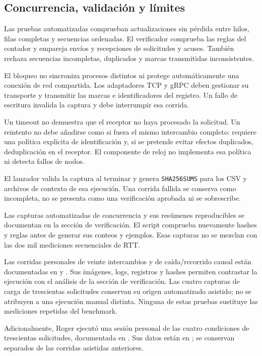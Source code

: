 \subsection{Concurrencia, validación y límites}
Las pruebas automatizadas comprueban actualizaciones sin pérdida entre hilos,
filas completas y secuencias ordenadas. El verificador
 comprueba las reglas del contador y empareja
envíos y recepciones de solicitudes y acuses. También rechaza secuencias
incompletas, duplicados y marcas transmitidas inconsistentes.

El bloqueo no sincroniza procesos distintos ni protege automáticamente una
conexión de red compartida. Los adaptadores TCP y gRPC deben gestionar su
transporte y transmitir las marcas e identificadores del registro. Un fallo
de escritura invalida la captura y debe interrumpir esa corrida.

Un timeout no demuestra que el receptor no haya procesado la solicitud. Un
reintento no debe añadirse como si fuera el mismo intercambio completo: requiere
una política explícita de identificación y, si se pretende evitar efectos
duplicados, deduplicación en el receptor. El componente de reloj no implementa
esa política ni detecta fallos de nodos.

El lanzador valida la captura al terminar y genera \texttt{SHA256SUMS} para los
CSV y archivos de contexto de esa ejecución. Una corrida fallida se conserva
como incompleta, no se presenta como una verificación aprobada ni se sobrescribe.

Las capturas automatizadas de concurrencia y sus resúmenes reproducibles se
documentan en la sección de verificación. El script
 comprueba nuevamente hashes y reglas
antes de generar sus conteos y ejemplos. Esas capturas no se mezclan con las
dos mil mediciones secuenciales de RTT.

Las corridas personales de veinte intercambios y de caída/recorrido causal están
documentadas en  y
. Sus imágenes, logs, registros y hashes
permiten contrastar la ejecución con el análisis de la sección de verificación.
Las cuatro capturas de carga de trescientas solicitudes conservan su origen
automatizado asistido; no se atribuyen a una ejecución manual distinta. Ninguna
de estas pruebas sustituye las mediciones repetidas del benchmark.

Adicionalmente, Roger ejecutó una sesión personal de las cuatro condiciones de
trescientas solicitudes, documentada en .
Sus datos están en ;
se conservan separados de las corridas asistidas anteriores.

